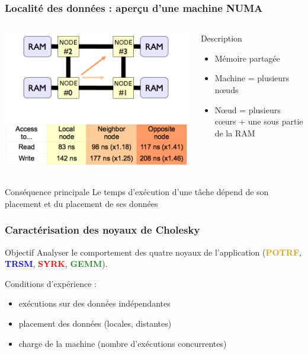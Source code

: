 \documentclass[xcolor={usenames,dvipsnames,svgnames,table}, aspectratio=43]{beamer}
\renewcommand{\emph}[1]{{\usebeamercolor[fg]{titlelike}#1}}
\newcommand{\potrfcolor}[1]{\textcolor{Goldenrod}{\textbf{#1}}\xspace}
\newcommand{\potrf}{\potrfcolor{POTRF}}
\newcommand{\trsmcolor}[1]{\textcolor{blue}{\textbf{#1}}\xspace}
\newcommand{\trsm}{\trsmcolor{TRSM}}
\newcommand{\syrkcolor}[1]{\textcolor{red}{\textbf{#1}}\xspace}
\newcommand{\syrk}{\syrkcolor{SYRK}}
\newcommand{\gemmcolor}[1]{\textcolor{ForestGreen}{\textbf{#1}}\xspace}
\newcommand{\gemm}{\gemmcolor{GEMM}}
\begin{document}
\begin{frame}
\frametitle{Localité des données : aperçu d'une machine NUMA}
\begin{columns}[T,onlytextwidth]
  \includegraphics[scale=0.3]{graph/NUMA-latences}

  \begin{block}{Description}
    \begin{itemize}
      \item Mémoire partagée
      \item Machine = plusieurs nœuds
      \item Nœud = plusieurs cœurs + une sous partie de la RAM
    \end{itemize}
  \end{block}

\end{columns}
\begin{alertblock}{Conséquence principale}
  Le temps d'exécution d'une tâche dépend de son placement et du placement de ses données
\end{alertblock}

\end{frame}

\begin{frame}
\frametitle{Caractérisation des noyaux de Cholesky}

\begin{block}{Objectif}
  Analyser le comportement des quatre noyaux de l'application (\potrf, \trsm, \syrk, \gemm).

  Conditions d'expérience :
  \begin{itemize}
    \item exécutions sur des données \emph{indépendantes}
    \item placement des données (locales, distantes)
    \item charge de la machine (nombre d'exécutions concurrentes)
  \end{itemize}
\end{block}

\end{frame}
\end{document}
